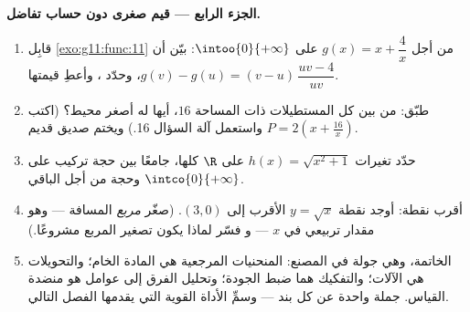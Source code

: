 \begin{problem}
\medskip
\noindent\textbf{الجزء الرابع --- قيم صغرى دون حساب تفاضل.}
\begin{enumerate}[resume]
  \item قابِل \cref{exo:g11:func:11} من أجل
        $g(x) = x + \dfrac4x$ على $\intoo{0}{+\infty}$: بيّن أن
        $g(v) - g(u) = (v - u)\,\dfrac{uv - 4}{uv}$، وحدّد
        ، وأعطِ قيمتها.
  \item طبّق: من بين كل المستطيلات ذات المساحة $16$، أيها له
        أصغر محيط؟ (اكتب $P = 2\left(x +
        \frac{16}{x}\right)$ واستعمل آلة السؤال 16.) ويختم
        صديق قديم.
  \item حدّد تغيرات
        $h(x) = \sqrt{x^2 + 1}$ على $\R$ كلها، جامعًا بين حجة
        تركيب على $\intco{0}{+\infty}$ وحجة
         من أجل الباقي.
  \item أقرب نقطة: أوجد نقطة 
        $y = \sqrt x$ الأقرب إلى $(3, 0)$. (صغّر
        \emph{مربع} المسافة --- وهو مقدار تربيعي في $x$ --- و
        فسّر لماذا يكون تصغير المربع مشروعًا.)
  \item الخاتمة، وهي جولة في المصنع: المنحنيات المرجعية هي المادة
        الخام؛ والتحويلات هي الآلات؛  والتفكيك هما
        ضبط الجودة؛ وتحليل الفرق إلى عوامل هو
        منضدة القياس. جملة واحدة عن كل بند --- وسمِّ
        الأداة القوية التي يقدمها الفصل التالي.
\end{enumerate}
\end{problem}
